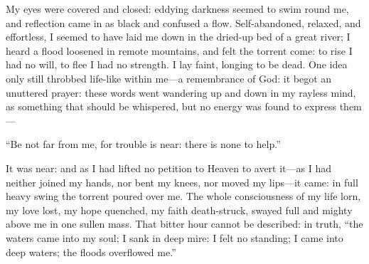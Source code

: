 My eyes were covered and closed: eddying darkness seemed to swim round
me, and reflection came in as black and confused a flow. 
Self-abandoned, relaxed, and effortless, I seemed to have laid me down
in the dried-up bed of a great river; I heard a flood loosened in remote
mountains, and felt the torrent come: to rise I had no will, to flee I
had no strength. I lay faint, longing to be dead. One idea only still
throbbed life-like within me---a remembrance of God: it begot an
unuttered prayer: these words went wandering up and down in my rayless
mind, as something that should be whispered, but no energy was found to
express them---

\enquote{Be not far from me, for trouble is near: there is none to
help.}

It was near: and as I had lifted no petition to Heaven to avert it---as
I had neither joined my hands, nor bent my knees, nor moved my lips---it
came: in full heavy swing the torrent poured over me. The whole
consciousness of my life lorn, my love lost, my hope quenched, my faith
death-struck, swayed full and mighty above me in one sullen mass. That
bitter hour cannot be described: in truth, \enquote{the waters came into
my soul; I sank in deep mire: I felt no standing; I came into deep
waters; the floods overflowed me.}

